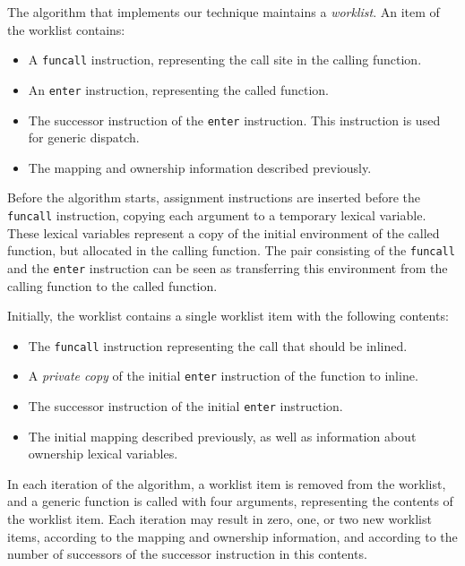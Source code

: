 The algorithm that implements our technique maintains a
\emph{worklist}.  An item of the worklist contains:

\begin{itemize}
\item A \texttt{funcall} instruction, representing the call site in the
  calling function.
\item An \texttt{enter} instruction, representing the called function.
\item The successor instruction of the \texttt{enter} instruction.
  This instruction is used for generic dispatch.
\item The mapping and ownership information described previously.
\end{itemize}

Before the algorithm starts, assignment instructions are inserted
before the \texttt{funcall} instruction, copying each argument to a
temporary lexical variable.  These lexical variables represent a copy
of the initial environment of the called function, but allocated in
the calling function.  The pair consisting of the \texttt{funcall} and
the \texttt{enter} instruction can be seen as transferring this
environment from the calling function to the called function.

Initially, the worklist contains a single worklist item with the
following contents:

\begin{itemize}
\item The \texttt{funcall} instruction representing the call that
  should be inlined.
\item A \emph{private copy} of the initial \texttt{enter} instruction
  of the function to inline.
\item The successor instruction of the initial \texttt{enter}
  instruction.
\item The initial mapping described previously, as well as
  information about ownership lexical variables.
\end{itemize}

In each iteration of the algorithm, a worklist item is removed from
the worklist, and a generic function is called with four arguments,
representing the contents of the worklist item.  Each iteration may
result in zero, one, or two new worklist items, according to the
mapping and ownership information, and according to the number of
successors of the successor instruction in this contents.


